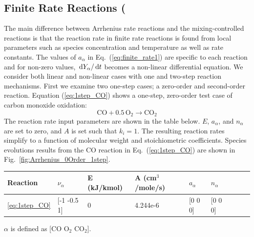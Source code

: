 \documentclass[11pt]{book}
\begin{document}
\subsection{Finite Rate Reactions (\texorpdfstring{})}

The main difference between Arrhenius rate reactions and the mixing-controlled reactions is that the reaction rate in finite rate reactions is found from local parameters such as species concentration and temperature as well as rate constants. The values of $a_{\alpha}$ in Eq.~(\ref{eq:finite_rate1}) are specific to each reaction and for non-zero values, $\,\mathrm{d} Y_{\alpha}/ \,\mathrm{d} t$ becomes  a non-linear differential equation. We consider both linear and non-linear cases with one and two-step reaction mechanisms. First we examine two one-step cases; a zero-order and second-order reaction. Equation (\ref{eq:1step_CO}) shows a one-step, zero-order test case of carbon monoxide oxidation:
\begin{equation}\label{eq:1step_CO}
\mathrm{CO+0.5 \, O_2 \rightarrow  CO_2}
\end{equation}
The reaction rate input parameters are shown in the table below. $E$, $a_{\alpha}$, and $n_{\alpha}$ are set to zero, and $A$ is set such that ${k}_{i} = 1$. The resulting reaction rates simplify to a function of molecular weight and stoichiometric coefficients. Species evolutions results from the CO reaction in Eq.~(\ref{eq:1step_CO}) are shown in Fig.~\ref{fig:Arrhenius_0Order_1step}.

\begin{center}
\begin{tabular}{|l|l|l|l|l|l|l|l|l|}
\hline Reaction & $\nu_{\alpha}$ & E (kJ/kmol) & A (cm$^3$/mole/s) & $a_{\alpha}$ & $n_{\alpha}$  \\ \hline \hline
\ref{eq:1step_CO} & [-1 -0.5 1] & 0 & 4.244e-6 & [0 0 0] & [0 0 0] \\ \hline
\end{tabular}
\vskip8pt
$\alpha$ is defined as [$\mathrm{CO}$ $\mathrm{O_2}$ $\mathrm{CO_2}$].
\end{center}
\end{document}
